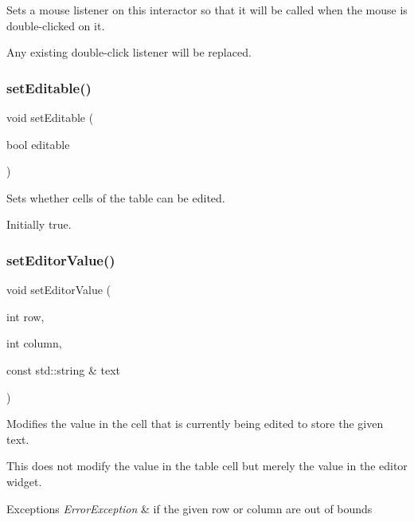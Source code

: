 Sets a mouse listener on this interactor so that it will be called when the mouse is double-\/clicked on it. 

Any existing double-\/click listener will be replaced. \mbox{\label{classGTable_a52455aaff9ee352ca405fa61ba246b84}} 
\subsubsection{\texorpdfstring{set\+Editable()}{setEditable()}}
{\footnotesize\ttfamily void set\+Editable (\begin{DoxyParamCaption}\item[{bool}]{editable }\end{DoxyParamCaption})\hspace{0.3cm}{\ttfamily [virtual]}}



Sets whether cells of the table can be edited. 

Initially true. \mbox{\label{classGTable_aaefc85e4ff762ca176a90ebac163f2c0}} 
\subsubsection{\texorpdfstring{set\+Editor\+Value()}{setEditorValue()}}
{\footnotesize\ttfamily void set\+Editor\+Value (\begin{DoxyParamCaption}\item[{int}]{row,  }\item[{int}]{column,  }\item[{const std\+::string \&}]{text }\end{DoxyParamCaption})\hspace{0.3cm}{\ttfamily [virtual]}}



Modifies the value in the cell that is currently being edited to store the given text. 

This does not modify the value in the table cell but merely the value in the editor widget. 
\begin{DoxyExceptions}{Exceptions}
{\em Error\+Exception} & if the given row or column are out of bounds \\
\hline
\end{DoxyExceptions}
\mbox{\label{classGInteractor_ab831367dd84bbd579e02e55bacb21343}} 
